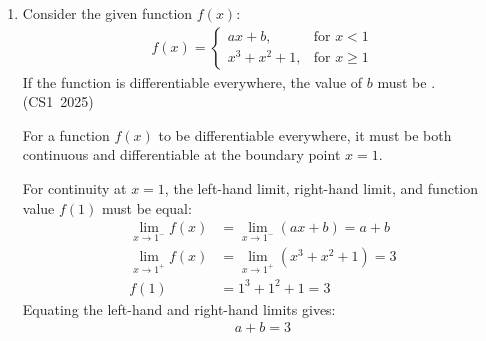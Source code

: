 \begin{enumerate}[label=\thesubsection.\arabic*, ref=\thesubsection.\theenumi]
\vspace{0.2cm}
\solution
The total number of ternary strings of length 5 is:
\begin{align}
N_{\text{total}} = 3^5 = 243
\end{align}
Using (\ref{eq:CS12025-no_consec_strings}), the number of ternary strings of length 5 with NO consecutive identical symbols is:
\begin{align}
N_{\text{no\_consec}} &= 3 \times (3-1)^{5-1} \\
                      &= 3 \times 2^4 \\
                      &= 48
\end{align}
Subtracting from the total gives the required count:
\begin{align}
N_{\text{consecutive}} &= 243 - 48 \\
                       &= 195
\end{align}

\vspace{0.5cm}
\item Consider the given function $f(x)$:
\begin{align*}
f(x) = \begin{cases} ax + b, & \text{for } x < 1 \\ x^3 + x^2 + 1, & \text{for } x \ge 1 \end{cases}
\end{align*}
If the function is differentiable everywhere, the value of $b$ must be \underline{\hspace{1cm}}.
\hfill (CS1~2025)

\vspace{0.2cm}
\solution
For a function $f(x)$ to be differentiable everywhere, it must be both continuous and differentiable at the boundary point $x = 1$.

For continuity at $x = 1$, the left-hand limit, right-hand limit, and function value $f(1)$ must be equal:
\begin{align}
\lim_{x \to 1^-} f(x) &= \lim_{x \to 1^-} (ax + b) = a + b \label{eq:cont_lhs} \\
\lim_{x \to 1^+} f(x) &= \lim_{x \to 1^+} (x^3 + x^2 + 1) = 3 \\
f(1) &= 1^3 + 1^2 + 1 = 3
\end{align}
Equating the left-hand and right-hand limits gives:
\begin{align}
a + b = 3 \label{eq:cont}
\end{align}


\end{enumerate}
